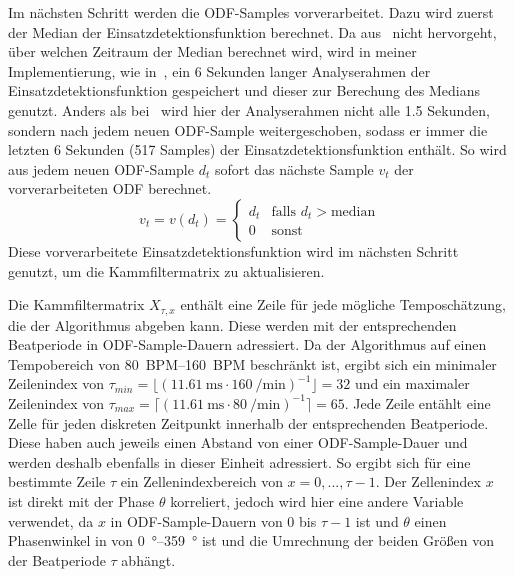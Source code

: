 {{{			%
			Im nächsten Schritt werden die ODF-Samples vorverarbeitet.
			Dazu wird zuerst der Median der Einsatzdetektionsfunktion berechnet.
			Da aus~\cite{2011_PlRoSt} nicht hervorgeht, über welchen Zeitraum der Median berechnet wird,
				wird in meiner Implementierung,
				wie in~\cite{2009_DaPlSt},
				ein \num{6} Sekunden langer Analyserahmen der Einsatzdetektionsfunktion gespeichert
				und dieser zur Berechung des Medians genutzt.
			Anders als bei~\cite{2009_DaPlSt} wird hier der Analyserahmen nicht alle \num{1.5} Sekunden,
				sondern nach jedem neuen ODF-Sample weitergeschoben,
				sodass er immer die letzten \num{6} Sekunden (\num{517} Samples) der Einsatzdetektionsfunktion enthält.
			So wird aus jedem neuen ODF-Sample $d_t$ sofort das nächste Sample $v_t$ der vorverarbeiteten ODF berechnet.
			\begin{equation}
				v_t = v(d_t) =
				\begin{cases}
					d_t & \text{falls } d_t > \text{median} \\
					0    & \text{sonst}
				\end{cases}
			\end{equation}
			Diese vorverarbeitete Einsatzdetektionsfunktion wird im nächsten Schritt genutzt,
				um die Kammfiltermatrix zu aktualisieren.

			Die Kammfiltermatrix $X_{\tau, x}$ enthält eine Zeile für jede mögliche Temposchätzung, die der Algorithmus abgeben kann.
			Diese werden mit der entsprechenden Beatperiode in ODF-Sample-Dauern adressiert.
			Da der Algorithmus auf einen Tempobereich von \SIrange{80}{160}{BPM} beschränkt ist,
				ergibt sich ein minimaler Zeilenindex von
				$\tau_{min} = \lfloor(\SI{11.61}{\milli\second} \cdot \SI{160}{\per\minute})^{-1}\rfloor = 32$
				und ein maximaler Zeilenindex von
				$\tau_{max} = \lceil(\SI{11.61}{\milli\second} \cdot \SI{80}{\per\minute})^{-1}\rceil = 65$.
			Jede Zeile entählt eine Zelle für jeden diskreten Zeitpunkt innerhalb der entsprechenden Beatperiode.
			Diese haben auch jeweils einen Abstand von einer ODF-Sample-Dauer
				und werden deshalb ebenfalls in dieser Einheit adressiert.
			So ergibt sich für eine bestimmte Zeile $\tau$ ein Zellenindexbereich von $x = 0, ..., \tau - 1$.
			Der Zellenindex $x$ ist direkt mit der Phase $\theta$ korreliert,
				jedoch wird hier eine andere Variable verwendet,
				da $x$ in ODF-Sample-Dauern von $0$ bis $\tau - 1$ ist
				und $\theta$ einen Phasenwinkel in von \SIrange{0}{359}{\degree} ist
				und die Umrechnung der beiden Größen von der Beatperiode $\tau$ abhängt.

}}}
